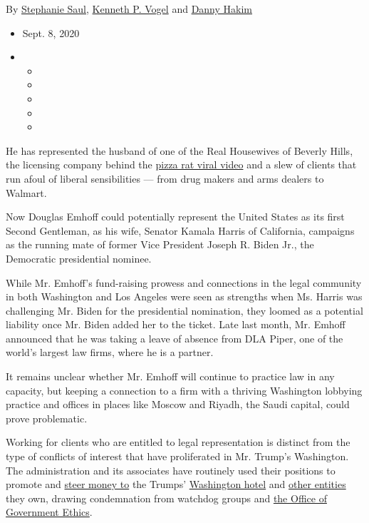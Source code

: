 By \href{https://www.nytimes3xbfgragh.onion/by/stephanie-saul}{Stephanie
Saul},
\href{https://www.nytimes3xbfgragh.onion/by/kenneth-p-vogel}{Kenneth P.
Vogel} and
\href{https://www.nytimes3xbfgragh.onion/by/danny-hakim}{Danny Hakim}

\begin{itemize}
\item
  Sept. 8, 2020
\item
  \begin{itemize}
  \item
  \item
  \item
  \item
  \item
  \end{itemize}
\end{itemize}

He has represented the husband of one of the Real Housewives of Beverly
Hills, the licensing company behind the
\href{https://www.nytimes3xbfgragh.onion/2015/09/23/nyregion/pizza-rat-spurs-debate-on-how-to-clean-up-new-yorks-subway-system.html}{pizza
rat viral video} and a slew of clients that run afoul of liberal
sensibilities --- from drug makers and arms dealers to Walmart.

Now Douglas Emhoff could potentially represent the United States as its
first Second Gentleman, as his wife, Senator Kamala Harris of
California, campaigns as the running mate of former Vice President
Joseph R. Biden Jr., the Democratic presidential nominee.

While Mr. Emhoff's fund-raising prowess and connections in the legal
community in both Washington and Los Angeles were seen as strengths when
Ms. Harris was challenging Mr. Biden for the presidential nomination,
they loomed as a potential liability once Mr. Biden added her to the
ticket. Late last month, Mr. Emhoff announced that he was taking a leave
of absence from DLA Piper, one of the world's largest law firms, where
he is a partner.

It remains unclear whether Mr. Emhoff will continue to practice law in
any capacity, but keeping a connection to a firm with a thriving
Washington lobbying practice and offices in places like Moscow and
Riyadh, the Saudi capital, could prove problematic.

Working for clients who are entitled to legal representation is distinct
from the type of conflicts of interest that have proliferated in Mr.
Trump's Washington. The administration and its associates have routinely
used their positions to promote and
\href{https://www.washingtonpost.com/politics/trump-company-secret-service-spending/2020/08/27/9331bd86-de36-11ea-8051-d5f887d73381_story.html}{steer
money to} the Trumps'
\href{https://www.nytimes3xbfgragh.onion/2019/09/07/us/politics/trump-hotel.html}{Washington
hotel} and
\href{https://www.nytimes3xbfgragh.onion/2018/01/24/us/politics/pro-trump-fundraising-trump-hotel.html}{other
entities} they own, drawing condemnation from watchdog groups and
\href{https://www.nytimes3xbfgragh.onion/2017/02/14/us/politics/Kellyanne-Conway-ivanka-trump-ethics.html}{the
Office of Government Ethics}.

